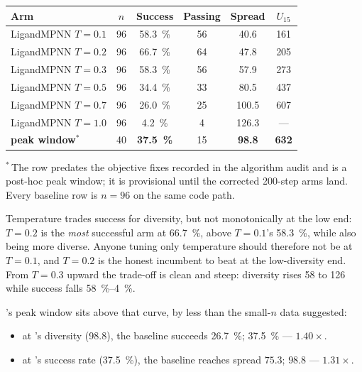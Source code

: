 \begin{center}
\begin{tabular}{@{}lccccc@{}}
\toprule
\textbf{Arm} & $n$ & \textbf{Success} & \textbf{Passing} &
\textbf{Spread} & $U_{15}$ \\
\midrule
LigandMPNN $T{=}0.1$ & 96 & \SI{58.3}{\percent} & 56 & 40.6  & 161 \\
LigandMPNN $T{=}0.2$ & 96 & \SI{66.7}{\percent} & 64 & 47.8  & 205 \\
LigandMPNN $T{=}0.3$ & 96 & \SI{58.3}{\percent} & 56 & 57.9  & 273 \\
LigandMPNN $T{=}0.5$ & 96 & \SI{34.4}{\percent} & 33 & 80.5  & 437 \\
LigandMPNN $T{=}0.7$ & 96 & \SI{26.0}{\percent} & 25 & 100.5 & 607 \\
LigandMPNN $T{=}1.0$ & 96 & \SI{4.2}{\percent}  & 4  & 126.3 & --- \\
\midrule
\textbf{\cleo{} peak window}$^{*}$ & 40 & \textbf{\SI{37.5}{\percent}} & 15 &
  \textbf{98.8} & \textbf{632} \\
\bottomrule
\end{tabular}
\end{center}

$^{*}$\,The \cleo{} row predates the objective fixes recorded in the algorithm
audit and is a post-hoc peak window; it is provisional until the corrected
200-step arms land. Every baseline row is $n = 96$ on the same code path.

Temperature trades success for diversity, but not monotonically at the low end:
$T{=}0.2$ is the \emph{most} successful arm at \SI{66.7}{\percent}, above
$T{=}0.1$'s \SI{58.3}{\percent}, while also being more diverse. Anyone tuning
only temperature should therefore not be at $T{=}0.1$, and $T{=}0.2$ is the
honest incumbent to beat at the low-diversity end. From $T{=}0.3$ upward the
trade-off is clean and steep: diversity rises 58 to 126 while success falls
\SIrange{58}{4}{\percent}.

\cleo{}'s peak window sits above that curve, by less than the small-$n$ data
suggested:

\begin{itemize}\setlength{\itemsep}{0pt}
  \item at \cleo{}'s diversity (98.8), the baseline succeeds
        \SI{26.7}{\percent}; \cleo{} \SI{37.5}{\percent} --- $\mathbf{1.40\times}$.
  \item at \cleo{}'s success rate (\SI{37.5}{\percent}), the baseline reaches
        spread $75.3$; \cleo{} $98.8$ --- $\mathbf{1.31\times}$.
\end{itemize}


